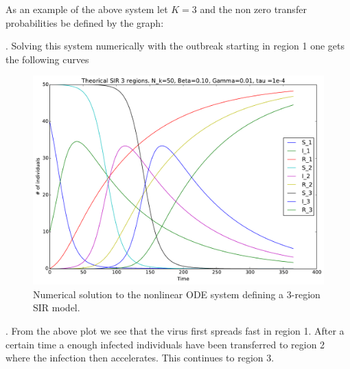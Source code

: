 As an example of the above system let $K=3$ and the non zero transfer probabilities be defined by the graph:
\begin{figure}[H]
	\centering
{}
\end{figure}
. Solving this system numerically with the outbreak starting in region 1 one gets the following curves
\begin{figure}[H]
	\centering
	\includegraphics[width= 1.0 \linewidth]{plots/sir_three_region.pdf}
	\caption{Numerical solution to the nonlinear ODE system defining a 3-region SIR model.}
\end{figure}
. From the above plot we see that the virus first spreads fast in region 1. After a certain time a enough infected individuals have been transferred to region 2 where the infection then accelerates. This continues to region 3. 

\subsection{}
